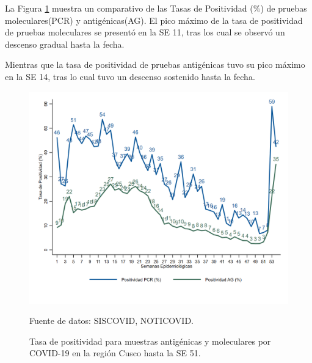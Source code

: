 \documentclass[12pt,a4paper,openany]{book}
\begin{document}
   La Figura \ref{fig:total_muestras_procesada} muestra un comparativo de las Tasas de Positividad ($\%$) de pruebas moleculares(PCR) y antigénicas(AG). El pico máximo de la tasa de positividad de pruebas moleculares se presentó en la SE 11, tras los cual se observó un descenso gradual hasta la fecha.
   
   Mientras que la tasa de positividad de pruebas antigénicas tuvo su pico máximo en la SE 14, tras lo cual tuvo un descenso sostenido hasta la fecha.
  
   
   \begin{figure}[h]
   	\caption{Tasa de positividad para muestras antigénicas y moleculares por COVID-19 en la región Cusco hasta la SE 51. }\label{fig:total_muestras_procesada}
   	\begin{center}
   		\includegraphics[width=0.80\linewidth]{../figuras/positividad_diaria}
   	\end{center}
   	{\footnotesize {Fuente de datos: SISCOVID, NOTICOVID.}}
   \end{figure}
\end{document}
